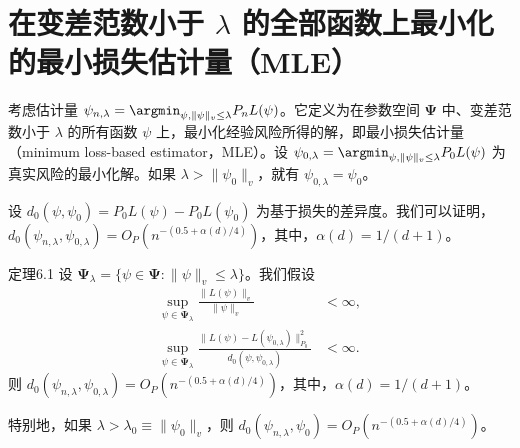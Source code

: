 \section{在变差范数小于 \texorpdfstring{$\lambda$}{λ} 的全部函数上最小化的最小损失估计量（MLE）}
\label{sec:ch06-minimum-loss-estimator}

考虑估计量 $\psi_{n,\lambda}=\argmin_{\psi,\|\psi\|_v\leq\lambda}P_nL(\psi)$。它定义为在参数空间 $\boldsymbol{\Psi}$ 中、变差范数小于 $\lambda$ 的所有函数 $\psi$ 上，最小化经验风险所得的解，即最小损失估计量（minimum loss-based estimator，MLE）。设 $\psi_{0,\lambda}=\argmin_{\psi,\|\psi\|_v\leq\lambda}P_0L(\psi)$ 为真实风险的最小化解。如果 $\lambda>\|\psi_0\|_v$，就有 $\psi_{0,\lambda}=\psi_0$。

设 $d_0(\psi,\psi_0)=P_0L(\psi)-P_0L(\psi_0)$ 为基于损失的差异度。我们可以证明，$d_0(\psi_{n,\lambda},\psi_{0,\lambda})=O_P(n^{-(0.5+\alpha(d)/4)})$，其中，$\alpha(d)=1/(d+1)$。

\begin{bookresult}{定理}{6.1}
设 $\boldsymbol{\Psi}_\lambda=\{\psi\in\boldsymbol{\Psi}:\|\psi\|_v\leq\lambda\}$。我们假设
\[
 \begin{aligned}
 \sup_{\psi\in\boldsymbol{\Psi}_\lambda}
       \frac{\|L(\psi)\|_v}{\|\psi\|_v}&<\infty,\\
 \sup_{\psi\in\boldsymbol{\Psi}_\lambda}
       \frac{\|L(\psi)-L(\psi_{0,\lambda})\|_{P_0}^2}
            {d_0(\psi,\psi_{0,\lambda})}&<\infty.
 \end{aligned}
\]
则 $d_0(\psi_{n,\lambda},\psi_{0,\lambda})=O_P(n^{-(0.5+\alpha(d)/4)})$，其中，$\alpha(d)=1/(d+1)$。

特别地，如果 $\lambda>\lambda_0\equiv\|\psi_0\|_v$，则 $d_0(\psi_{n,\lambda},\psi_0)=O_P(n^{-(0.5+\alpha(d)/4)})$。
\end{bookresult}

